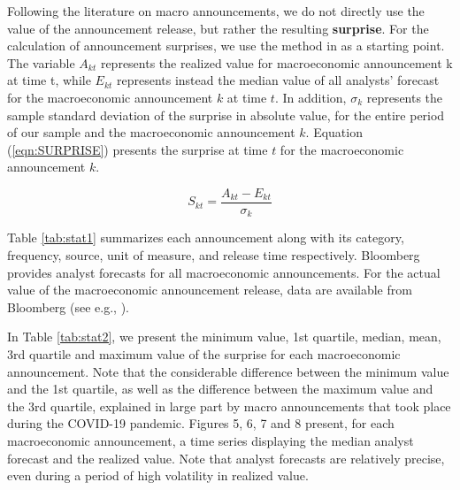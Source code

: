 \documentclass[12pt]{article}
\begin{document}
Following the literature on macro announcements, we do not directly use the value of the announcement release, but rather the resulting \textbf{surprise}. For the calculation of announcement surprises, we use the method in \citet{balduzzi2001economic} as a starting point. The variable $A_{kt}$ represents the realized value for macroeconomic announcement k at time t, while $E_{kt}$ represents instead the median value of all analysts’ forecast for the macroeconomic announcement $k$ at time $t$. In addition, $\sigma_k$ represents the sample standard deviation of the surprise in absolute value, for the entire period of our sample and the macroeconomic announcement $k$. Equation (\ref{eqn:SURPRISE}) presents the surprise at time $t$ for the macroeconomic announcement $k$.

\begin{equation}\label{eqn:SURPRISE}
S_{kt}=\frac{A_{kt}-E_{kt}}{\sigma_k}
\end{equation}

Table \ref{tab:stat1} summarizes each announcement along with its category, frequency, source, unit of measure, and release time respectively. Bloomberg provides analyst forecasts for all macroeconomic announcements. For the actual value of the macroeconomic announcement release, data are available from Bloomberg (see e.g., \citep{kurov2019price}). 

In Table \ref{tab:stat2}, we present the minimum value, 1st quartile, median, mean, 3rd quartile and maximum value of the surprise for each macroeconomic announcement. Note that the considerable difference between the minimum value and the 1st quartile, as well as the difference between the maximum value and the 3rd quartile, explained in large part by macro announcements that took place during the COVID-19 pandemic. Figures 5, 6, 7 and 8 present, for each macroeconomic announcement, a time series displaying the median analyst forecast and the realized value. Note that analyst forecasts are relatively precise, even during a period of high volatility in realized value.
\end{document}
